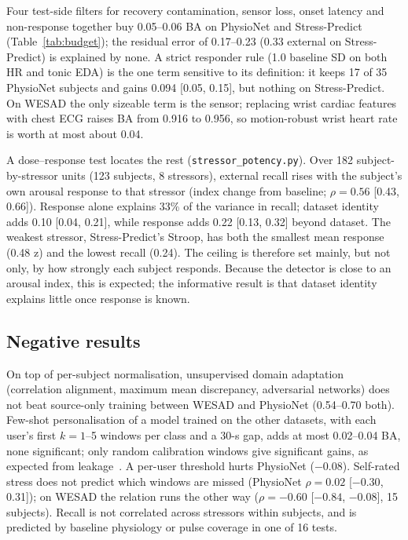 \documentclass[journal]{IEEEtran}
\begin{document}
Four test-side filters for recovery contamination, sensor loss, onset latency and non-response together buy 0.05--0.06 BA on PhysioNet and Stress-Predict (Table~\ref{tab:budget}); the residual error of 0.17--0.23 (0.33 external on Stress-Predict) is explained by none. A strict responder rule (1.0 baseline SD on both HR and tonic EDA) is the one term sensitive to its definition: it keeps 17 of 35 PhysioNet subjects and gains 0.094 [0.05, 0.15], but nothing on Stress-Predict. On WESAD the only sizeable term is the sensor; replacing wrist cardiac features with chest ECG raises BA from 0.916 to 0.956, so motion-robust wrist heart rate is worth at most about 0.04.

A dose--response test locates the rest (\texttt{stressor\_potency.py}). Over 182 subject-by-stressor units (123 subjects, 8 stressors), external recall rises with the subject's own arousal response to that stressor (index change from baseline; $\rho=0.56$ [0.43, 0.66]). Response alone explains 33\% of the variance in recall; dataset identity adds 0.10 [0.04, 0.21], while response adds 0.22 [0.13, 0.32] beyond dataset. The weakest stressor, Stress-Predict's Stroop, has both the smallest mean response (0.48 z) and the lowest recall (0.24). The ceiling is therefore set mainly, but not only, by how strongly each subject responds. Because the detector is close to an arousal index, this is expected; the informative result is that dataset identity explains little once response is known.

\subsection{Negative results}
On top of per-subject normalisation, unsupervised domain adaptation (correlation alignment, maximum mean discrepancy, adversarial networks) does not beat source-only training between WESAD and PhysioNet (0.54--0.70 both). Few-shot personalisation of a model trained on the other datasets, with each user's first $k=1$--5 windows per class and a 30-s gap, adds at most 0.02--0.04 BA, none significant; only random calibration windows give significant gains, as expected from leakage~\cite{tervonen2026,akkaya2026}. A per-user threshold hurts PhysioNet ($-0.08$). Self-rated stress does not predict which windows are missed (PhysioNet $\rho=0.02$ [$-0.30$, 0.31]); on WESAD the relation runs the other way ($\rho=-0.60$ [$-0.84$, $-0.08$], 15 subjects). Recall is not correlated across stressors within subjects, and is predicted by baseline physiology or pulse coverage in one of 16 tests.
\end{document}
